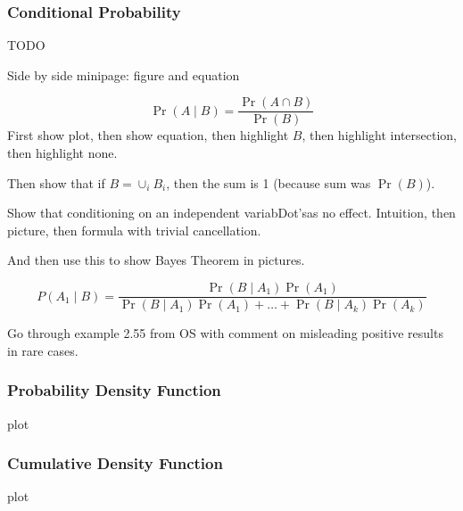 \documentclass[t]{beamer}
\begin{document}
\begin{frame}
  \frametitle{Conditional Probability}

  TODO

  Side by side minipage: figure and equation

  \begin{displaymath}
    \Pr(A\mid B) = \frac{\Pr(A\cap B)}{\Pr(B)}
  \end{displaymath}
  First show plot, then show equation, then highlight $B$, then
  highlight intersection, then highlight none.

  Then show that if $B=\cup_i B_i$, then the sum is 1 (because sum was
  $\Pr(B)$).

  Show that conditioning on an independent variabDot'sas no effect.
  Intuition, then picture, then formula with trivial cancellation.

  And then use this to show Bayes Theorem in pictures.

  \begin{displaymath}
    P(A_1 \mid B) = \frac{\Pr(B\mid A_1) \Pr(A_1)}{\Pr(B\mid A_1)\Pr(A_1) + \dots +
      \Pr(B\mid A_k)\Pr(A_k)}
  \end{displaymath}

  Go through example 2.55 from OS with comment on misleading positive
  results in rare cases.
\end{frame}

\begin{frame}
  \frametitle{Probability Density Function}

  plot

\end{frame}

\begin{frame}
  \frametitle{Cumulative Density Function}

  plot

\end{frame}
\end{document}
